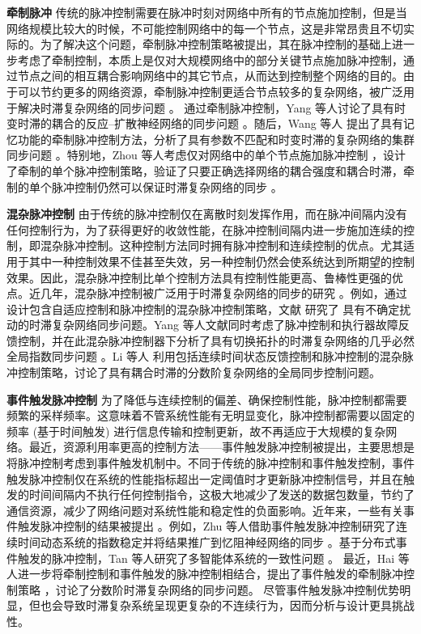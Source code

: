 \textbf{ 牵制脉冲}   传统的脉冲控制需要在脉冲时刻对网络中所有的节点施加控制，但是当网络规模比较大的时候，不可能控制网络中的每一个节点，这是非常昂贵且不切实际的。为了解决这个问题，牵制脉冲控制策略被提出，其在脉冲控制的基础上进一步考虑了牵制控制，本质上是仅对大规模网络中的部分关键节点施加脉冲控制，通过节点之间的相互耦合影响网络中的其它节点，从而达到控制整个网络的目的。由于可以节约更多的网络资源，牵制脉冲控制更适合节点较多的复杂网络，被广泛用于解决时滞复杂网络的同步问题 \cite{2012Synchronization285,2013Synchronization3486,2019An2561,zhou2011pinning2882,liu2020intralayer3006032}。  通过牵制脉冲控制，Yang 等人讨论了具有时变时滞的耦合的反应--扩散神经网络的同步问题 \cite{2013Synchronization3486}。随后，Wang 等人
提出了具有记忆功能的牵制脉冲控制方法，分析了具有参数不匹配和时变时滞的复杂网络的集群同步问题 \cite{2019An2561}。特别地，Zhou 等人考虑仅对网络中的单个节点施加脉冲控制 ，设计了牵制的单个脉冲控制策略，验证了只要正确选择网络的耦合强度和耦合时滞，牵制的单个脉冲控制仍然可以保证时滞复杂网络的同步 \cite{zhou2011pinning2882}。 

\textbf{混杂脉冲控制} 由于传统的脉冲控制仅在离散时刻发挥作用，而在脉冲间隔内没有任何控制行为，为了获得更好的收敛性能，在脉冲控制间隔内进一步施加连续的控制，即混杂脉冲控制。这种控制方法同时拥有脉冲控制和连续控制的优点。尤其适用于其中一种控制效果不佳甚至失效，另一种控制仍然会使系统达到所期望的控制效果。因此，混杂脉冲控制比单个控制方法具有控制性能更高、鲁棒性更强的优点。近几年，混杂脉冲控制被广泛用于时滞复杂网络的同步的研究 \cite{yang2014hybrid480,2020Synchronization4043,li2019global31}。例如，通过设计包含自适应控制和脉冲控制的混杂脉冲控制策略，文献 \cite{yang2014hybrid480}  研究了
具有不确定扰动的时滞复杂网络同步问题。Yang 等人文献同时考虑了脉冲控制和执行器故障反馈控制，并在此混杂脉冲控制器下分析了具有切换拓扑的时滞复杂网络的几乎必然全局指数同步问题 \cite{2020Synchronization4043}。Li 等人  利用包括连续时间状态反馈控制和脉冲控制的混杂脉冲控制策略，讨论了具有耦合时滞的分数阶复杂网络的全局同步控制问题\cite{li2019global31}。



 \textbf{事件触发脉冲控制} 
为了降低与连续控制的偏差、确保控制性能，脉冲控制都需要频繁的采样频率。这意味着不管系统性能有无明显变化，脉冲控制都需要以固定的频率 (基于时间触发) 进行信息传输和控制更新，故不再适应于大规模的复杂网络。最近，资源利用率更高的控制方法——事件触发脉冲控制被提出，主要思想是将脉冲控制考虑到事件触发机制中。不同于传统的脉冲控制和事件触发控制，事件触发脉冲控制仅在系统的性能指标超出一定阈值时才更新脉冲控制信号，并且在触发的时间间隔内不执行任何控制指令，这极大地减少了发送的数据包数量，节约了通信资源，减少了网络问题对系统性能和稳定性的负面影响。近年来，一些有关事件触发脉冲控制的结果被提出 \cite{2019Consensus792,Zhu2018Event,2020Leader1,2021Synchronization2491}。例如，Zhu 等人借助事件触发脉冲控制研究了连续时间动态系统的指数稳定并将结果推广到忆阻神经网络的同步 \cite{Zhu2018Event}。基于分布式事件触发的脉冲控制，Tan 等人研究了多智能体系统的一致性问题 \cite{2019Consensus792}。 
最近，Hai 等人进一步将牵制控制和事件触发的脉冲控制相结合，提出了事件触发的牵制脉冲控制策略  \cite{Xudong2020Pinning105017}，讨论了分数阶时滞复杂网络的同步问题。 尽管事件触发脉冲控制优势明显，但也会导致时滞复杂系统呈现更复杂的不连续行为，因而分析与设计更具挑战性。

